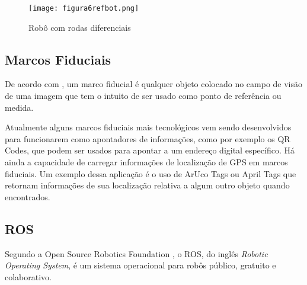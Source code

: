 	\begin{figure}[h!]												
		\centering												
		\texttt{[image: figura6refbot.png]}			
		\caption{Robô com rodas diferenciais
		}		
		\label{img:denavit}	
	\end{figure}

\subsection{Marcos Fiduciais}
De acordo com \cite{lightbody}, um marco fiducial é qualquer objeto colocado no campo de visão de uma imagem que tem o intuito de ser usado como ponto de referência ou medida.

Atualmente alguns marcos fiduciais mais tecnológicos vem sendo desenvolvidos para funcionarem como apontadores de informações, como por exemplo os QR Codes, que podem ser usados para apontar a um endereço digital específico. Há ainda a capacidade de carregar informações de localização de GPS em marcos fiduciais. Um exemplo dessa aplicação é o uso de ArUco Tags ou April Tags que retornam informações de sua localização relativa a algum outro objeto quando encontrados.

\subsection{ROS}
Segundo a Open Source Robotics Foundation \cite{ros}, o ROS, do inglês \textit{Robotic Operating System}, é um sistema operacional para robôs público, gratuito e colaborativo.

